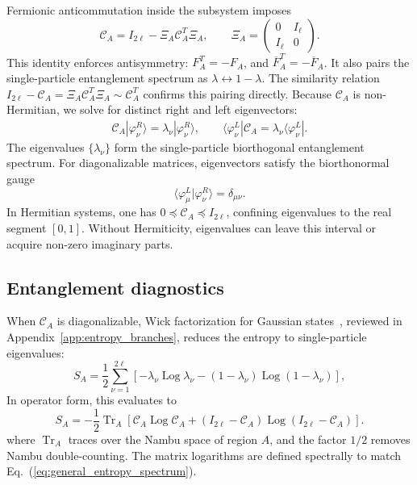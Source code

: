 \documentclass[aps,prb,reprint,superscriptaddress,amsmath,amssymb,floatfix]{revtex4-2}
\begin{document}
  Fermionic anticommutation inside the subsystem imposes
\begin{equation}
\mathcal C_A = I_{2\ell} - \Xi_A\mathcal C_A^T\Xi_A, \qquad \Xi_A= \begin{pmatrix} 0&I_\ell\\ I_\ell&0 \end{pmatrix}.
\label{eq:subsystem_fermionic_compatibility}
\end{equation}
This identity enforces antisymmetry: $F_A^T=-F_A$, and $\overline F_A^T=-\overline F_A$. It also pairs the single-particle entanglement spectrum as $\lambda\leftrightarrow1-\lambda$. The similarity relation $I_{2\ell}-\mathcal C_A=\Xi_A\mathcal C_A^T\Xi_A\sim\mathcal C_A^T$ confirms this pairing directly.
%
  Because $\mathcal C_A$ is non-Hermitian, we solve for distinct right and left eigenvectors:
\begin{equation}
\begin{aligned}
\mathcal C_A |\varphi_\nu^R\rangle = \lambda_\nu |\varphi_\nu^R\rangle, \qquad \langle\varphi_\nu^L| \mathcal C_A = \lambda_\nu \langle\varphi_\nu^L|.
\end{aligned} \label{eq:general_ent_spectrum}
\end{equation}
The eigenvalues $\{\lambda_\nu\}$ form the single-particle biorthogonal entanglement spectrum. For diagonalizable matrices, eigenvectors satisfy the biorthonormal gauge
\begin{equation}
\langle\varphi_\mu^L|\varphi_\nu^R\rangle = \delta_{\mu\nu}.
\end{equation}
In Hermitian systems, one has $0\preceq\mathcal C_A\preceq I_{2\ell}$, confining eigenvalues to the real segment $[0,1]$. Without Hermiticity, eigenvalues can leave this interval or acquire non-zero imaginary parts.

\subsection{Entanglement diagnostics}

  When $\mathcal C_A$ is diagonalizable, Wick factorization for Gaussian states~\cite{PeschelEisler2009,Herviou2019,Guo2021}, reviewed in Appendix~\ref{app:entropy_branches}, reduces the entropy to single-particle eigenvalues:
\begin{equation}
S_A = \frac{1}{2} \sum_{\nu=1}^{2\ell} \left[ -\lambda_\nu\operatorname{Log}\lambda_\nu - (1-\lambda_\nu)\operatorname{Log}(1-\lambda_\nu) \right],
\label{eq:general_entropy_spectrum}
\end{equation}
In operator form, this evaluates to
\begin{equation}
S_A = -\frac{1}{2} \operatorname{Tr}_{A} \left[ \mathcal C_A\operatorname{Log}\mathcal C_A + \left(I_{2\ell}-\mathcal C_A\right) \operatorname{Log}\left(I_{2\ell}-\mathcal C_A\right) \right].
\label{eq:general_entropy}
\end{equation}
where $\operatorname{Tr}_{A}$ traces over the Nambu space of region $A$, and the factor $1/2$ removes Nambu double-counting. The matrix logarithms are defined spectrally to match Eq.~(\ref{eq:general_entropy_spectrum}).
\end{document}
